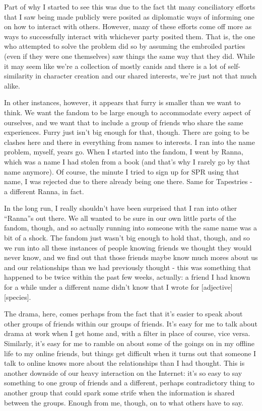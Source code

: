 Part of why I started to see this was due to the fact tht many conciliatory efforts that I saw being made publicly were posited as diplomatic ways of informing one on how to interact with others. However, many of these efforts come off more as ways to successfully interact with whichever party posited them. That is, the one who attempted to solve the problem did so by assuming the embroiled parties (even if they were one themselves) saw things the same way that they did. While it may seem like we're a collection of mostly canids and there is a lot of self-similarity in character creation and our shared interests, we're just not that much alike.

In other instances, however, it appears that furry is smaller than we want to think. We want the fandom to be large enough to accommodate every aspect of ourselves, and we want that to include a group of friends who share the same experiences. Furry just isn't big enough for that, though. There are going to be clashes here and there in everything from names to interests. I ran into the name problem, myself, years go. When I started into the fandom, I went by Ranna, which was a name I had stolen from a book (and that's why I rarely go by that name anymore). Of course, the minute I tried to sign up for SPR using that name, I was rejected due to there already being one there. Same for Tapestries - a different Ranna, in fact.

In the long run, I really shouldn't have been surprised that I ran into other ``Ranna''s out there. We all wanted to be sure in our own little parts of the fandom, though, and so actually running into someone with the same name was a bit of a shock. The fandom just wasn't big enough to hold that, though, and so we run into all these instances of people knowing friends we thought they would never know, and we find out that those friends maybe know much mores about us and our relationships than we had previously thought - this was something that happened to be twice within the past few weeks, actually: a friend I had known for a while under a different name didn't know that I wrote for {[}adjective{]}{[}species{]}.

The drama, here, comes perhaps from the fact that it's easier to speak about other groups of friends within our groups of friends. It's easy for me to talk about drama at work when I get home and, with a filter in place of course, vice versa. Similarly, it's easy for me to ramble on about some of the goings on in my offline life to my online friends, but things get difficult when it turns out that someone I talk to online knows more about the relationships than I had thought. This is another downside of our heavy interaction on the Internet: it's so easy to say something to one group of friends and a different, perhaps contradictory thing to another group that could spark some strife when the information is shared between the groups. Enough from me, though, on to what others have to say.

